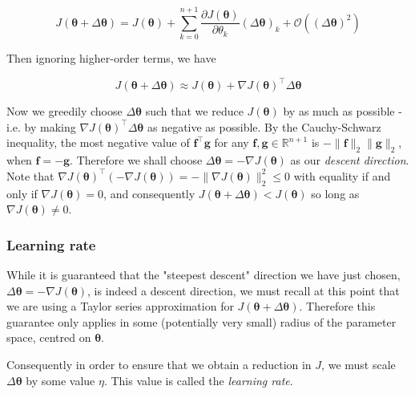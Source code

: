 \documentclass{article}[11pt]
\begin{document}
            $$
            J(\boldsymbol{\theta} + \Delta \boldsymbol{\theta}) = J(\boldsymbol{\theta}) + \sum_{k=0}^{n+1} \frac{\partial J(\boldsymbol{\theta})}{\partial \theta_k} (\Delta \boldsymbol{\theta})_k + \mathcal{O} ((\Delta \boldsymbol{\theta})^2)
            $$
            
            Then ignoring higher-order terms, we have
            
            $$
            J(\boldsymbol{\theta} + \Delta \boldsymbol{\theta}) \approx J(\boldsymbol{\theta}) + \nabla J(\boldsymbol{\theta})^\top \Delta \boldsymbol{\theta}
            $$
            
            Now we greedily choose $\Delta \boldsymbol{\theta}$ such that we reduce $J(\boldsymbol{\theta})$ by as much as possible - i.e. by making $\nabla J(\boldsymbol{\theta})^\top \Delta \boldsymbol{\theta}$ as negative as possible. By the Cauchy-Schwarz inequality, the most negative value of $\mathbf{f}^\top \mathbf{g}$ for any $\mathbf{f}, \mathbf{g} \in \mathbb{R}^{n+1}$ is $- \lVert \mathbf{f} \rVert_2 \lVert \mathbf{g} \rVert_2$, when $\mathbf{f} = -\mathbf{g}$. Therefore we shall choose $\Delta \boldsymbol{\theta} = - \nabla J(\boldsymbol{\theta})$ as our \textit{descent direction}. Note that $\nabla J(\boldsymbol{\theta})^\top (- \nabla J(\boldsymbol{\theta})) = -\lVert \nabla J(\boldsymbol{\theta}) \rVert_2^2 \leq 0$ with equality if and only if $\nabla J(\boldsymbol{\theta}) = 0$, and consequently $J(\boldsymbol{\theta} + \Delta \boldsymbol{\theta}) < J(\boldsymbol{\theta})$ so long as $\nabla J(\boldsymbol{\theta}) \neq 0$.
        
    
    
        \subsubsection{Learning rate}
            
            While it is guaranteed that the "steepest descent" direction we have just chosen, $\Delta \boldsymbol{\theta} = - \nabla J(\boldsymbol{\theta})$, is indeed a descent direction, we must recall at this point that we are using a Taylor series approximation for $J(\boldsymbol{\theta} + \Delta \boldsymbol{\theta})$. Therefore this guarantee only applies in some (potentially very small) radius of the parameter space, centred on $\boldsymbol{\theta}$.
            
            Consequently in order to ensure that we obtain a reduction in $J$, we must scale $\Delta \boldsymbol{\theta}$ by some value $\eta$. This value is called the \textit{learning rate}.
            
\end{document}
